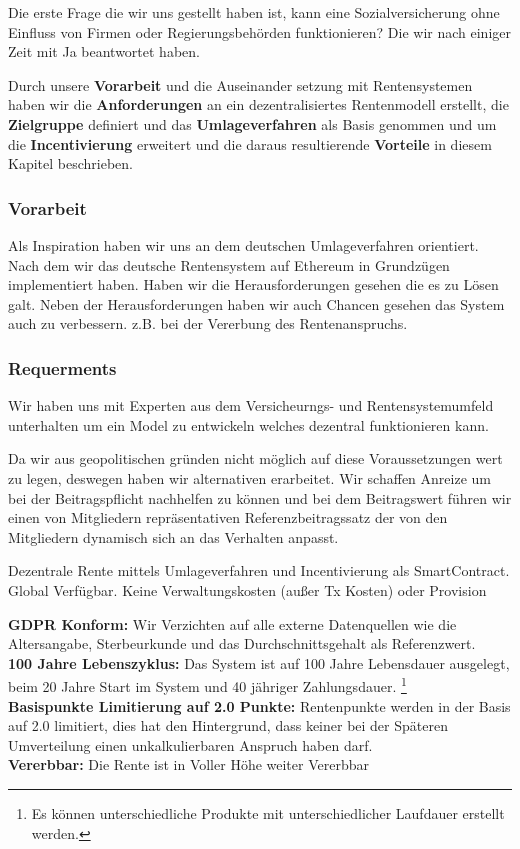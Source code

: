Die erste Frage die wir uns gestellt haben ist, kann eine Sozialversicherung ohne Einfluss von Firmen oder Regierungsbehörden funktionieren? Die wir nach einiger Zeit mit Ja beantwortet haben.

Durch unsere \textbf{Vorarbeit} und die Auseinander setzung mit Rentensystemen haben wir die \textbf{Anforderungen} an ein dezentralisiertes Rentenmodell erstellt, die  \textbf{Zielgruppe} definiert und das \textbf{Umlageverfahren} als Basis genommen und um die \textbf{Incentivierung} erweitert und die daraus resultierende \textbf{Vorteile} in diesem Kapitel beschrieben.

\subsubsection*{Vorarbeit}

Als Inspiration haben wir uns an dem deutschen Umlageverfahren orientiert. Nach dem wir das deutsche Rentensystem auf Ethereum in Grundzügen implementiert haben. Haben wir die Herausforderungen gesehen die es zu Lösen galt.
Neben der Herausforderungen haben wir auch Chancen gesehen das System auch zu verbessern. z.B. bei der Vererbung des Rentenanspruchs.


\subsubsection*{Requerments}

Wir haben uns mit Experten aus dem Versicheurngs- und Rentensystemumfeld unterhalten um ein Model zu entwickeln welches dezentral funktionieren kann.

Da wir aus geopolitischen gründen nicht möglich auf diese Voraussetzungen wert zu legen, deswegen haben wir alternativen erarbeitet.
Wir schaffen Anreize um bei der Beitragspflicht nachhelfen zu können und bei dem Beitragswert führen wir einen von Mitgliedern repräsentativen Referenzbeitragssatz der von den Mitgliedern dynamisch sich an das Verhalten anpasst.

Dezentrale Rente mittels Umlageverfahren und Incentivierung als SmartContract.
Global Verfügbar. Keine Verwaltungskosten (außer Tx Kosten) oder Provision

\textbf{GDPR\cite{gdpr} Konform:} Wir Verzichten auf alle externe Datenquellen wie die Altersangabe, Sterbeurkunde und das Durchschnittsgehalt als Referenzwert.\\
\textbf{100 Jahre Lebenszyklus:} Das System ist auf 100 Jahre Lebensdauer ausgelegt, beim 20 Jahre Start im System und 40 jähriger Zahlungsdauer. \footnote{ Es können unterschiedliche Produkte mit unterschiedlicher Laufdauer erstellt werden.} \\
\textbf{Basispunkte Limitierung auf 2.0 Punkte:} Rentenpunkte werden in der Basis auf 2.0 limitiert, dies hat den Hintergrund, dass keiner bei der Späteren Umverteilung einen unkalkulierbaren Anspruch haben darf.\\
\textbf{Vererbbar:} Die Rente ist in Voller Höhe weiter Vererbbar


